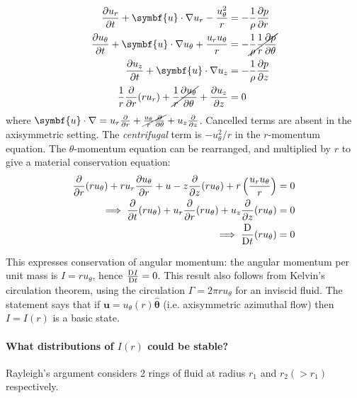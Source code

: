 \documentclass{jknotes}
\renewcommand{\u}{\symbf{u}}
\begin{document}
\begin{align}
	\frac{\partial u_r}{\partial t} + \u \cdot \nabla u_r -
	\frac{u_\theta^2}{r} &= - \frac{1}{\rho}\frac{\partial p}{\partial r} \\
	\frac{\partial u_\theta}{\partial t} + \u \cdot \nabla u_\theta +
	\frac{u_r u_\theta}{r} &= - \cancel{\frac{1}{\rho}\frac{1}{r}\frac{\partial
p}{\partial \theta}} \\
	\frac{\partial u_z}{\partial t} + \u \cdot \nabla u_z
	 &= - \frac{1}{\rho}\frac{\partial p}{\partial z} \\
	 \frac{1}{r}\frac{\partial}{\partial r}(ru_r) +
	 \cancel{\frac{1}{r}\frac{\partial u_\theta}{\partial \theta}} +
			\frac{\partial u_z}{\partial z} &= 0 
\end{align}
where $\u \cdot \nabla = u_r \frac{\partial}{\partial r} + \cancel{
\frac{u_\theta}{r}\frac{\partial}{\partial \theta}} + u_z
\frac{\partial}{\partial z}$. Cancelled terms are absent in the axisymmetric
setting. The \emph{centrifugal} term is $-u_\theta^2/r$ in the $r$-momentum
equation. The $\theta$-momentum equation can be rearranged, and multiplied by
$r$ to give a material conservation equation:
\begin{align}
	\frac{\partial}{\partial r} (ru_\theta) + r u_r \frac{\partial
	u_\theta}{\partial r} + u-z \frac{\partial}{\partial z} (ru_\theta) +
	r\left(\frac{u_r u_\theta}{r}\right) &= 0 \\
	\implies \frac{\partial}{\partial t} (ru_\theta) + u_r
	\frac{\partial}{\partial r}(ru_\theta) + u_z \frac{\partial}{\partial
z}(ru_\theta) &= 0  \\
\implies \frac{\mathrm{D}}{\mathrm{D} t} (ru_\theta) &= 0
\end{align}

This expresses conservation of angular momentum: the angular momentum per unit
mass is $I = ru_\theta$, hence $\frac{\mathrm{D} I}{\mathrm{D} t} = 0$. This result
also follows from Kelvin's circulation theorem, using the circulation $\Gamma
= 2\pi r u_\theta$ for an inviscid fluid. The statement says that if $\u =
u_\theta(r)\hat{\symbf{\theta}}$ (i.e. axisymmetric azimuthal flow) then $I =
I(r)$ is a basic state.


\paragraph{What distributions of $I(r)$ could be stable?}
Rayleigh's argument considers 2 rings of fluid at radius $r_1$ and $r_2 (>
r_1)$ respectively. 
\begin{center}
\end{center}
\end{document}
